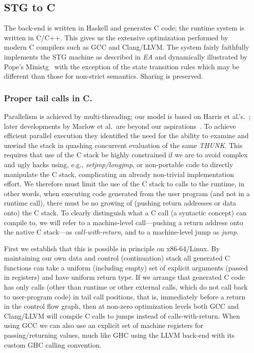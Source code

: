 \documentclass{llncs}
\begin{document}
\subsection{STG to C}
The back-end is written in Haskell and generates C code; the runtime system is
written in C/C++. This gives us the extensive optimization performed by modern
C compilers such as GCC and Clang/LLVM. The system fairly faithfully
implements the STG machine as described in \emph{EA} and dynamically
illustrated by Pope's Ministg~\cite{ministg} with the exception of the state
transition rules which may be different than those for non-strict semantics.
Sharing is preserved.

\subsubsection{Proper tail calls in C.}
Parallelism is achieved by multi-threading; our model is based on Harris et
al.'s.~\cite{Harris:2005}; later developments by Marlow et al.\ are beyond our
aspirations~\cite{Marlow:2009,Marlow:2011}.  To achieve efficient parallel
execution they identified the need for the ability to examine and unwind the
stack in quashing concurrent evaluation of the same \emph{THUNK}\@.  This
requires that use of the C stack be highly constrained if we are to avoid
complex and ugly hacks using, e.g., \emph{setjmp/longjmp}, or non-portable
code to directly manipulate the C stack, complicating an already non-trivial
implementation effort.  We therefore must limit the use of the C stack to
calls to the runtime, in other words, when executing code generated from the
user program (and not in a runtime call), there must be no growing of (pushing
return addresses or data onto) the C stack.
%
To clearly distinguish what a C call (a syntactic concept) can compile to, we
will refer to a machine-level call---pushing a return address onto the native
C stack---as \emph{call-with-return}, and to a machine-level jump as
\emph{jump}.

First we establish that this is possible in principle on x86-64/Linux.  By
maintaining our own data and control (continuation) stack all generated C
functions can take a uniform (including empty) set of explicit arguments
(passed in registers) and have uniform return type. If we arrange that
generated C code has only calls (other than runtime or other external calls,
which do not call back to user-program code) in tail call positions, that is,
immediately before a return in the control flow graph, then at non-zero
optimization levels both GCC and Clang/LLVM will compile C calls to jumps
instead of calls-with-return.  When using GCC we can also use an explicit set
of machine registers for passing/returning values, much like GHC using the
LLVM back-end with its custom GHC calling convention.
\end{document}
